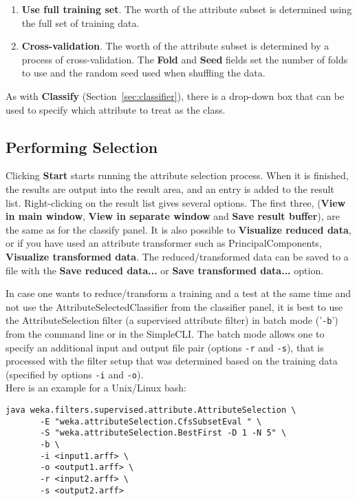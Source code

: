 \documentclass[a4paper]{article}
\begin{document}
\begin{enumerate}
\item \textbf{Use full training set}.
The worth of the attribute subset is determined using the full set of training
data. 
\item \textbf{Cross-validation}.
The worth of the attribute subset is determined by a process of
cross-validation.  The \textbf{Fold} and \textbf{Seed} fields set the number of
folds to use and the random seed used when shuffling the data.
\end{enumerate}
\noindent
As with \textbf{Classify} (Section~\ref{sec:classifier}), there is a drop-down
box that can be used to specify which attribute to treat as the class.

\subsection{Performing Selection}

Clicking \textbf{Start} starts running the attribute selection
process.  When it is finished, the results are output into the result
area, and an entry is added to the result list.  Right-clicking on the
result list gives several options. The first three, (\textbf{View in
main window}, \textbf{View in separate window} and \textbf{Save result
buffer}), are the same as for the classify panel.  It is also possible
to \textbf{Visualize reduced data}, or if you have used an attribute
transformer such as PrincipalComponents, \textbf{Visualize transformed
data}. The reduced/transformed data can be saved to a file with the 
\textbf{Save reduced data...} or \textbf{Save transformed data...}
option.

In case one wants to reduce/transform a training and a test at the same 
time and not use the AttributeSelectedClassifier from the classifier 
panel, it is best to use the AttributeSelection filter (a supervised 
attribute filter) in batch mode ('\texttt{-b}') 
from the command line or in the SimpleCLI. The batch mode allows one to 
specify an additional input and output file pair (options \texttt{-r} 
and \texttt{-s}), that is processed with the filter setup that 
was determined based on the training data (specified by options 
\texttt{-i} and \texttt{-o}). \\

\noindent Here is an example for a Unix/Linux bash:
\begin{verbatim}
java weka.filters.supervised.attribute.AttributeSelection \
       -E "weka.attributeSelection.CfsSubsetEval " \
       -S "weka.attributeSelection.BestFirst -D 1 -N 5" \
       -b \
       -i <input1.arff> \
       -o <output1.arff> \
       -r <input2.arff> \
       -s <output2.arff>
\end{verbatim}
\end{document}
